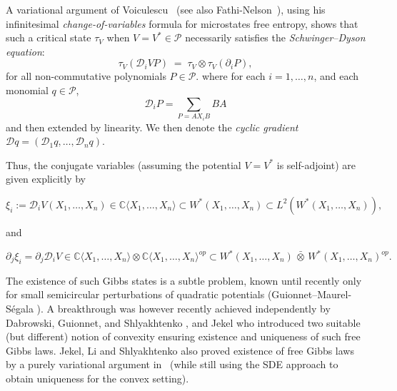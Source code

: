 \documentclass[10pt,a4paper,reqno]{amsart}
\begin{document}
A variational argument of Voiculescu~\cite[Section~3.7]{VF} (see also Fathi-Nelson~\cite[Lemma~1.6]{FN}), using his infinitesimal \emph{change-of-variables} formula for microstates free entropy, shows that such a critical state $\tau_V$ when $V=V^*\in \mathscr P$ necessarily satisfies the \emph{Schwinger--Dyson equation}:
\begin{equation}
    \tau_V(\mathscr{D}_i VP)\;=\;\tau_V\otimes \tau_V(\partial_i P),
\end{equation}
for all non-commutative polynomials $P\in \mathscr{P}$. 
where for each $i=1,\ldots,n$, and each monomial $q\in \mathscr{P}$, 
\begin{equation}
    \mathscr{D}_iP=\sum_{P=AX_iB}BA
\end{equation}
and then extended by linearity. We then denote the \emph{cyclic gradient} $\mathscr{D}q=(\mathscr{D}_1q,\ldots,\mathscr{D}_nq)$.
\begin{flushleft}
Thus, the conjugate variables (assuming the potential $V=V^*$ is self-adjoint) are given explicitly by






\[
\xi_i := \mathscr{D}_i V(X_1,\ldots,X_n)\in \mathbb{C}\langle X_1,\ldots,X_n\rangle \subset W^*(X_1,\ldots,X_n)\subset L^2(W^*(X_1,\ldots,X_n)),
\]


and


\[
\partial_j \xi_i = \partial_j \mathscr{D}_i V \in \mathbb{C}\langle X_1,\ldots,X_n\rangle \otimes \mathbb{C}\langle X_1,\ldots,X_n\rangle^{op} \subset W^*(X_1,\ldots,X_n)\,\bar{\otimes}\,W^*(X_1,\ldots,X_n)^{op}.
\]



The existence of such Gibbs states is a subtle problem, known until recently only for small semicircular perturbations of quadratic potentials (Guionnet--Maurel-Ségala \cite{GM}). A breakthrough was however recently achieved independently by Dabrowski, Guionnet, and Shlyakhtenko \cite{YGS}, and Jekel \cite{Jek3} who introduced two suitable (but different) notion of convexity ensuring existence and uniqueness of such free Gibbs laws. Jekel, Li and Shlyakhtenko also proved existence of free Gibbs laws by a purely variational argument in~\cite[Section~7]{Jek4} (while still using the SDE approach to obtain uniqueness for the convex setting).
\end{flushleft}
\end{document}
